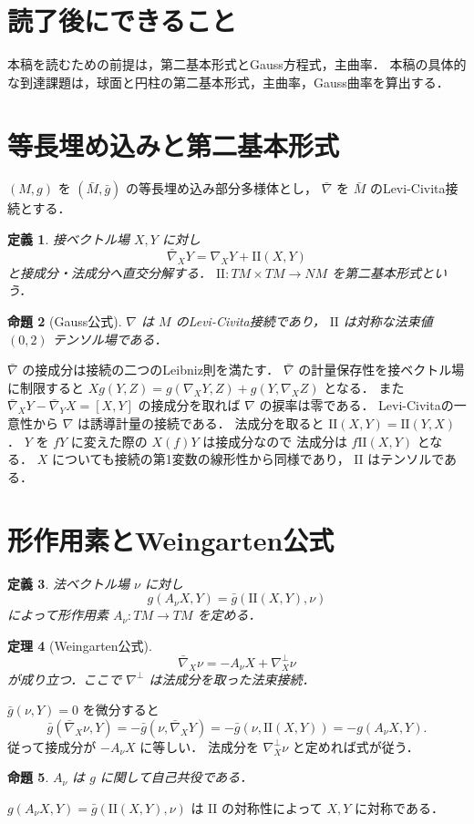 \documentclass[a5paper,10pt,onecolumn]{jsarticle}
\makeatletter
\theoremstyle{mathnotetheorem}
\newtheorem{theorem}{定理}[section]
\newtheorem{definition}[theorem]{定義}
\newtheorem{proposition}[theorem]{命題}
\renewcommand{\proofname}{証明}
\renewenvironment{proof}[1][\proofname]{%
  \par\pushQED{\qed}\normalfont\topsep4\p@\@plus2\p@\relax
  \trivlist\item[\hskip\labelsep\bfseries #1]\ignorespaces
}{\popQED\endtrivlist\@endpefalse}
\makeatother
\begin{document}
\section*{読了後にできること}
本稿を読むための前提は，第二基本形式とGauss方程式，主曲率．
本稿の具体的な到達課題は，球面と円柱の第二基本形式，主曲率，Gauss曲率を算出する．


\section{等長埋め込みと第二基本形式}
$(M,g)$ を $(\bar M,\bar g)$ の等長埋め込み部分多様体とし，
$\bar\nabla$ を $\bar M$ のLevi-Civita接続とする．
\begin{definition}
接ベクトル場 $X,Y$ に対し
\[
 \bar\nabla_XY=\nabla_XY+\mathrm{II}(X,Y)
\]
と接成分・法成分へ直交分解する．
$\mathrm{II}:TM\times TM\to NM$ を第二基本形式という．
\end{definition}
\begin{proposition}[Gauss公式]\label{prop:gauss}
$\nabla$ は $M$ のLevi-Civita接続であり，
$\mathrm{II}$ は対称な法束値 $(0,2)$ テンソル場である．
\end{proposition}
\begin{proof}
$\bar\nabla$ の接成分は接続の二つのLeibniz則を満たす．
$\bar\nabla$ の計量保存性を接ベクトル場に制限すると
$Xg(Y,Z)=g(\nabla_XY,Z)+g(Y,\nabla_XZ)$ となる．
また
$\bar\nabla_XY-\bar\nabla_YX=[X,Y]$ の接成分を取れば
$\nabla$ の捩率は零である．
Levi-Civitaの一意性から $\nabla$ は誘導計量の接続である．
法成分を取ると $\mathrm{II}(X,Y)=\mathrm{II}(Y,X)$．
$Y$ を $fY$ に変えた際の $X(f)Y$ は接成分なので
法成分は $f\mathrm{II}(X,Y)$ となる．
$X$ についても接続の第1変数の線形性から同様であり，
$\mathrm{II}$ はテンソルである．
\end{proof}
\section{形作用素とWeingarten公式}
\begin{definition}
法ベクトル場 $\nu$ に対し
\[
 g(A_\nu X,Y)=\bar g(\mathrm{II}(X,Y),\nu)
\]
によって形作用素 $A_\nu:TM\to TM$ を定める．
\end{definition}
\begin{theorem}[Weingarten公式]
\[
 \bar\nabla_X\nu=-A_\nu X+\nabla_X^\perp\nu
\]
が成り立つ．ここで $\nabla^\perp$ は法成分を取った法束接続．
\end{theorem}
\begin{proof}
$\bar g(\nu,Y)=0$ を微分すると
\[
 \bar g(\bar\nabla_X\nu,Y)
 =-\bar g(\nu,\bar\nabla_XY)
 =-\bar g(\nu,\mathrm{II}(X,Y))
 =-g(A_\nu X,Y).
\]
従って接成分が $-A_\nu X$ に等しい．
法成分を $\nabla_X^\perp\nu$ と定めれば式が従う．
\end{proof}
\begin{proposition}
$A_\nu$ は $g$ に関して自己共役である．
\end{proposition}
\begin{proof}
$g(A_\nu X,Y)=\bar g(\mathrm{II}(X,Y),\nu)$
は $\mathrm{II}$ の対称性によって $X,Y$ に対称である．
\end{proof}
\end{document}
